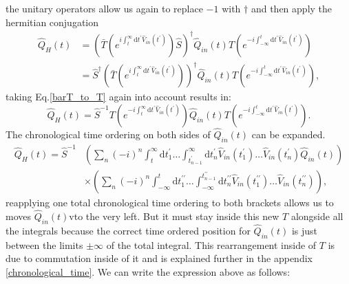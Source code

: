 \documentclass[12pt, titlepage]{article}
\begin{document}
 the unitary operators allow us again to replace $ -1 $ with $ \dagger $ and then apply  the hermitian conjugation
\begin{subequations}
\begin{align}
\hat{Q}_{H}(t)
&=\left( 
\bar{T}
\left( 
 e^{i\int_{t}^{\infty}\mathrm{d}t^{\prime} \hat{V}_{in}(t^{\prime})}
\right) 
\hat{S}
\right)^{\dagger}
\hat{Q}_{in}(t)
T
\left( 
 e^{-i\int_{-\infty}^{t}\mathrm{d}t^{\prime} \hat{V}_{in}(t^{\prime})}
\right) 
\\
&=
\hat{S}^{\dagger}\left( 
\bar{T}
\left( 
 e^{i\int_{t}^{\infty}\mathrm{d}t^{\prime} \hat{V}_{in}(t^{\prime})}
\right) 
\right)^{\dagger}
\hat{Q}_{in}(t)
T
\left( 
 e^{-i\int_{-\infty}^{t}\mathrm{d}t^{\prime} \hat{V}_{in}(t^{\prime})}
\right) 
,
\end{align}
\end{subequations}
taking Eq.\enskip\eqref{barT_to_T} again into account results in:
\begin{equation}
\hat{Q}_{H}(t)
=
\hat{S}^{-1} 
T
\left( 
 e^{-i\int_{t}^{\infty}\mathrm{d}t^{\prime} \hat{V}_{in}(t^{\prime})}
\right)
\hat{Q}_{in}(t)
T
\left( 
 e^{-i\int_{-\infty}^{t}\mathrm{d}t^{\prime} \hat{V}_{in}(t^{\prime})}
\right) .
\end{equation}
The chronological time ordering on both sides of $ \hat{Q}_{in}(t) $ can be expanded.
\begin{equation}
\begin{split}
\hat{Q}_{H}(t)
=
\hat{S}^{-1} 
&\left( 
\sum_{n}
(-i)^{n}
\int_{t}^{\infty}\mathrm{d}t_{1}^{\prime}
\ldots
\int_{t^{\prime}_{n-1}}^{\infty}\mathrm{d}t_{n}^{\prime}
\hat{V}_{in}(t_{1}^{\prime})
\ldots
\hat{V}_{in}(t_{n}^{\prime})
\hat{Q}_{in}(t)
\right)
\\
&\times
\left( 
\sum_{n}
(-i)^{n}
\int_{-\infty}^{t}\mathrm{d}t_{1}^{\prime\prime}
\ldots
\int_{-\infty}^{t^{\prime\prime}_{n-1}}\mathrm{d}t_{n}^{\prime\prime}
\hat{V}_{in}(t_{1}^{\prime\prime})
\ldots
\hat{V}_{in}(t_{n}^{\prime\prime})
\right)
,
\end{split}
\end{equation}
reapplying one total chronological time ordering to both brackets allows us to moves $ \hat{Q}_{in}(t)
 $vto the very left. But it must stay inside this new $ T $ alongside all the integrals because the correct time ordered position for $ \hat{Q}_{in}(t)
 $ is just between the limits $ \pm \infty $ of the total integral. This rearrangement inside of $ T $ is due to commutation inside of it and is explained further in the  appendix \ref{chronological_time}. We can write the expression above as follows:
\end{document}
